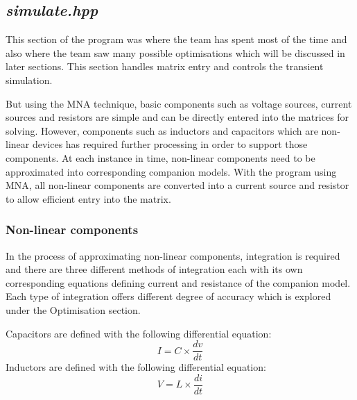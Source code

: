 \documentclass[12pt,a4paper]{article}
\begin{document}
	\subsection{\textit{simulate.hpp}}
	This section of the program was where the team has spent most of the time and also where the
	team saw many possible optimisations which will be discussed in later sections. This 
	section handles matrix entry and controls the transient simulation. \par
	But using the MNA technique, basic components such as voltage sources, current 
	sources and resistors are simple and can be directly entered into the matrices for 
	solving. However, components such as inductors and capacitors which are non-linear
	devices has required further processing in order to support those components. 
	At each instance in time, non-linear components need to be approximated into corresponding
	companion models. With the program using MNA, all non-linear components are converted 
	into a current source and resistor to allow efficient entry into the matrix.
	\subsubsection{Non-linear components}
	In the process of approximating non-linear components, integration is 
	required and there are three different 
	methods of integration each with its own corresponding equations defining 
	current and resistance of the companion model. Each type of integration offers different
	degree of accuracy which is explored under the Optimisation section.\par
	Capacitors are defined with the following differential equation:
	$$I=C\times \frac{dv}{dt}$$
	Inductors are defined with the following differential equation:
	$$V=L\times \frac{di}{dt}$$
	
\end{document}
